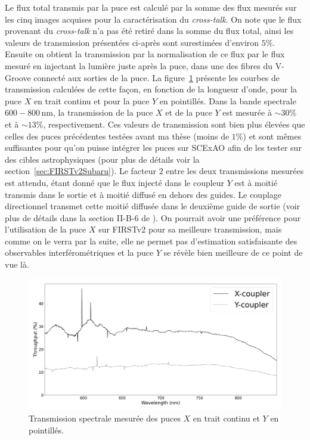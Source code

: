 
Le flux total transmis par la puce est calculé par la somme des flux mesurés sur les cinq images acquises pour la caractérisation du \textit{cross-talk}. On note que le flux provenant du \textit{cross-talk} n'a pas été retiré dans la somme du flux total, ainsi les valeurs de transmission présentées ci-après sont surestimées d'environ $5\%$. Ensuite on obtient la transmission par la normalisation de ce flux par le flux mesuré en injectant la lumière juste après la puce, dans une des fibres du V-Groove connecté aux sorties de la puce. La figure~\ref{fig:ChipThroughput} présente les courbes de transmission calculées de cette façon, en fonction de la longueur d'onde, pour la puce $X$ en trait continu et pour la puce $Y$ en pointillés. Dans la bande spectrale $600 - 800 \,$nm, la transmission de la puce $X$ et de la puce $Y$ est mesurée à $\sim 30\%$ et à $\sim 13\%$, respectivement. Ces valeurs de transmission sont bien plus élevées que celles des puces précédentes testées avant ma thèse (moins de $1\%$) et sont mêmes suffisantes pour qu'on puisse intégrer les puces sur \ac{SCExAO} afin de les tester sur des cibles astrophysiques (pour plus de détails voir la section~\ref{sec:FIRSTv2Subaru}). Le facteur $2$ entre les deux transmissions mesurées est attendu, étant donné que le flux injecté dans le coupleur $Y$ est à moitié transmis dans le sortie et à moitié diffusé en dehors des guides. Le couplage directionnel transmet cette moitié diffusée dans le deuxième guide de sortie (voir plus de détails dans la section II-B-6 de \cite{labeye2008}). On pourrait avoir une préférence pour l'utilisation de la puce $X$ sur \ac{FIRSTv2} pour sa meilleure transmission, mais comme on le verra par la suite, elle ne permet pas d'estimation satisfaisante des observables interférométriques et la puce $Y$ se révèle bien meilleure de ce point de vue là.

\begin{figure}[ht!]
    \centering
    \includegraphics[width=\figwidth]{Figure_Chap2/ThroughputComparison_20201124_20201119_LaTex.png}
    \caption[Transmission spectrale mesurée des puces $X$ et $Y$.]{Transmission spectrale mesurée des puces $X$ en trait continu et $Y$ en pointillés.}
    \label{fig:ChipThroughput}
\end{figure}


